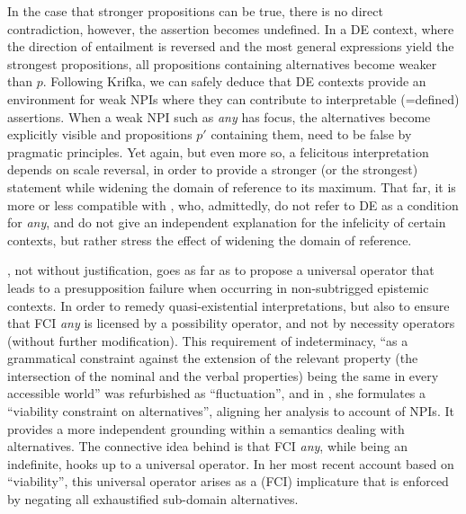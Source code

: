 \documentclass[output=paper,colorlinks,citecolor=brown,
]{langscibook}
\begin{document}
In the case that stronger propositions can be true, there is no direct contradiction, however, the assertion becomes
undefined. In a DE context, where the direction of entailment is reversed and the most general expressions yield the
strongest propositions, all propositions containing alternatives become weaker than $p$. Following Krifka, we can
safely deduce that DE contexts provide an environment for weak NPIs where they can contribute to interpretable
(=defined) assertions. When a weak NPI such as \textit{any} has focus, the alternatives become explicitly visible and
propositions $p'$ containing them, need to be false by pragmatic principles. Yet again, but even more so, a felicitous
interpretation depends on scale reversal, in order to provide a stronger (or the strongest) statement while widening
the domain of reference to its maximum. That far, it is more or less compatible with \citet{kadmonlandmann1993}, who,
admittedly, do not refer to DE as a condition for \textit{any}, and do not give an independent explanation for the
infelicity of certain contexts, but rather stress the effect of widening the domain of reference.

\citet{dayal1998}, not without justification, goes as far as to propose a universal operator that leads to a
presupposition failure when occurring in non-subtrigged epistemic contexts. In order to remedy quasi-existential
interpretations, but also to ensure that FCI {\em any} is licensed by a possibility operator, and not by necessity
operators (without further modification). This requirement of indeterminacy, ``as a grammatical constraint against
the extension of the relevant property (the intersection of the nominal and the verbal properties) being the same in
every accessible world'' \citep[237]{dayal2009} was refurbished as “fluctuation”, and  in \citet{dayal2013}, she
formulates a “viability constraint on alternatives”, aligning her analysis to 
account of NPIs. It provides a more independent grounding within a semantics dealing with alternatives. The connective
idea behind is that FCI {\em any}, while being an indefinite, hooks up to a universal operator. In her most recent
account based on “viability”, this universal operator arises as a (FCI) implicature that is enforced by negating all
exhaustified sub-domain alternatives.
\end{document}
